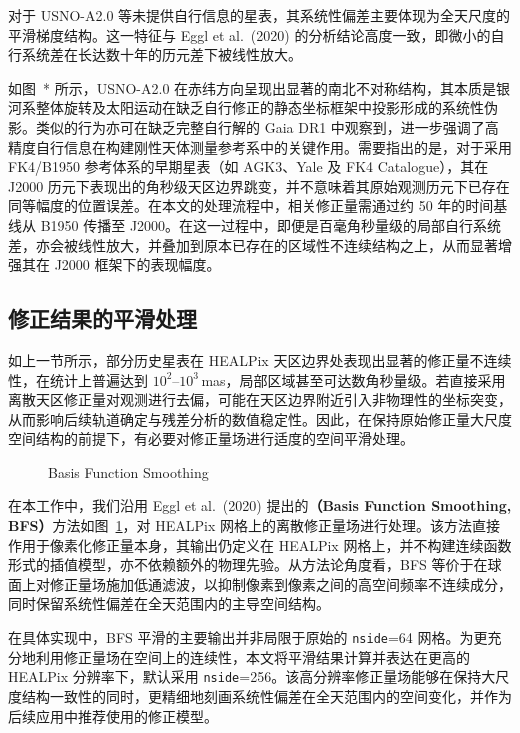 \documentclass{aastex701}
\begin{document}
对于 USNO-A2.0 等未提供自行信息的星表，其系统性偏差主要体现为全天尺度的平滑梯度结构。这一特征与 Eggl et al.\ (2020) 的分析结论高度一致，即微小的自行系统差在长达数十年的历元差下被线性放大。

如图~* 所示，USNO-A2.0 在赤纬方向呈现出显著的南北不对称结构，其本质是银河系整体旋转及太阳运动在缺乏自行修正的静态坐标框架中投影形成的系统性伪影。类似的行为亦可在缺乏完整自行解的 Gaia DR1 中观察到，进一步强调了高精度自行信息在构建刚性天体测量参考系中的关键作用。需要指出的是，对于采用 FK4/B1950 参考体系的早期星表（如 AGK3、Yale 及 FK4 Catalogue），其在 J2000 历元下表现出的角秒级天区边界跳变，并不意味着其原始观测历元下已存在同等幅度的位置误差。在本文的处理流程中，相关修正量需通过约 50 年的时间基线从 B1950 传播至 J2000。在这一过程中，即便是百毫角秒量级的局部自行系统差，亦会被线性放大，并叠加到原本已存在的区域性不连续结构之上，从而显著增强其在 J2000 框架下的表现幅度。

\subsection{修正结果的平滑处理} \label{subsec:smoothing}

如上一节所示，部分历史星表在 HEALPix 天区边界处表现出显著的修正量不连续性，在统计上普遍达到 $10^2$--$10^3$\,mas，局部区域甚至可达数角秒量级。若直接采用离散天区修正量对观测进行去偏，可能在天区边界附近引入非物理性的坐标突变，从而影响后续轨道确定与残差分析的数值稳定性。因此，在保持原始修正量大尺度空间结构的前提下，有必要对修正量场进行适度的空间平滑处理。
\begin{figure}[ht!]
\caption{Basis Function Smoothing}
\label{fig:bias_ucac4_zoom_compare_n256}
\end{figure}
在本工作中，我们沿用 Eggl et al.\ (2020) 提出的\textbf{（Basis Function Smoothing, BFS）}方法如图~\ref{fig:bias_ucac4_zoom_compare_n256}，对 HEALPix 网格上的离散修正量场进行处理。该方法直接作用于像素化修正量本身，其输出仍定义在 HEALPix 网格上，并不构建连续函数形式的插值模型，亦不依赖额外的物理先验。从方法论角度看，BFS 等价于在球面上对修正量场施加低通滤波，以抑制像素到像素之间的高空间频率不连续成分，同时保留系统性偏差在全天范围内的主导空间结构。

在具体实现中，BFS 平滑的主要输出并非局限于原始的 \texttt{nside}=64 网格。为更充分地利用修正量场在空间上的连续性，本文将平滑结果计算并表达在更高的 HEALPix 分辨率下，默认采用 \texttt{nside}=256。该高分辨率修正量场能够在保持大尺度结构一致性的同时，更精细地刻画系统性偏差在全天范围内的空间变化，并作为后续应用中推荐使用的修正模型。
\end{document}
